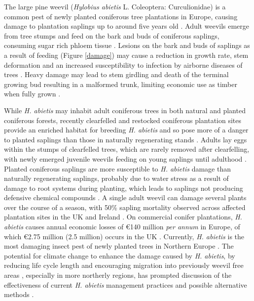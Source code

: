 \documentclass[a4paper, 11pt]{article}
\newcommand{\textapprox}{\raisebox{0.5ex}{\texttildelow}}
\begin{document}
The large pine weevil (\textit{Hylobius abietis} L. Coleoptera: Curculionidae) is a common pest of newly planted coniferous tree plantations in Europe, causing damage to plantation saplings up to around five years old \citep{Ordlander1997}. Adult weevils emerge from tree stumps and feed on the bark and buds of coniferous saplings, consuming sugar rich phloem tissue \citep{Nordlander1991}. Lesions on the bark and buds of saplings as a result of feeding (Figure \ref{damage}) may cause a reduction in growth rate, stem deformation and an increased susceptibility to infection by airborne diseases of trees \citep{Leather1999}. Heavy damage may lead to stem girdling and death of the terminal growing bud resulting in a malformed trunk, limiting economic use as timber when fully grown \citep{Alfaro1989, Gill1992}. 

While \textit{H. abietis} may inhabit adult coniferous trees in both natural and planted coniferous forests, recently clearfelled and restocked coniferous plantation sites provide an enriched habitat for breeding \textit{H. abietis} and so pose more of a danger to planted saplings than those in naturally regenerating stands \citep{Willoughby2004, Orlander1999}. Adults lay eggs within the stumps of clearfelled trees, which are rarely removed after clearfelling, with newly emerged juvenile weevils feeding on young saplings until adulthood \citep{Willoughby2004}. Planted coniferous saplings are more susceptible to \textit{H. abietis} damage than naturally regenerating saplings, probably due to water stress as a result of damage to root systems during planting, which leads to saplings not producing defensive chemical compounds \citep{Selander1990}. A single adult weevil can damage several plants over the course of a season, with \textapprox{}50\% sapling mortality observed across affected plantation sites in the UK and Ireland \citep{Heritage2001}. On commercial conifer plantations, \textit{H. abietis} causes annual economic losses of \euro{}140 million \textit{per annum} in Europe, of which \euro{}2.75 million (\textapprox{}\textsterling{}2.5 million) occurs in the UK \citep{Evans2015}. Currently, \textit{H. abietis} is the most damaging insect pest of newly planted trees in Northern Europe \citep{Evans2015}. The potential for climate change to enhance the damage caused by \textit{H. abietis}, by reducing life cycle length \citep{Leather1999} and encouraging migration into previously weevil free areas \citep{Inward2012, Barredo2015}, especially in more northerly regions, has prompted discussion of the effectiveness of current \textit{H. abietis} management practices and possible alternative methods \citep{Kapranas2017, McNamara2018}.
\end{document}
